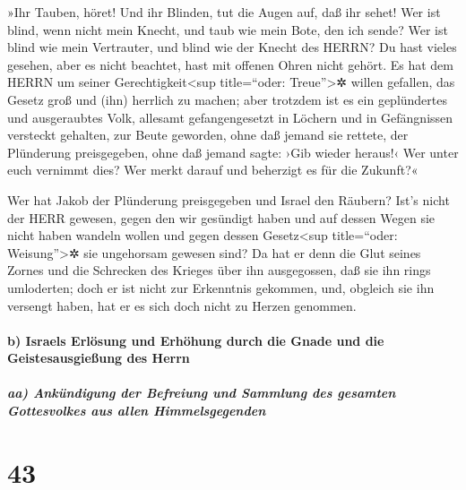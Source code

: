 »Ihr Tauben, höret! Und ihr Blinden, tut die Augen auf,
daß ihr sehet! Wer ist blind, wenn nicht mein Knecht, und
taub wie mein Bote, den ich sende? Wer ist blind wie mein Vertrauter,
und blind wie der Knecht des HERRN? Du hast vieles
gesehen, aber es nicht beachtet, hast mit offenen Ohren nicht gehört.
Es hat dem HERRN um seiner Gerechtigkeit\textless sup
title=``oder: Treue''\textgreater✲ willen gefallen, das Gesetz groß und
(ihn) herrlich zu machen; aber trotzdem ist es ein
geplündertes und ausgeraubtes Volk, allesamt gefangengesetzt in Löchern
und in Gefängnissen versteckt gehalten, zur Beute geworden, ohne daß
jemand sie rettete, der Plünderung preisgegeben, ohne daß jemand sagte:
›Gib wieder heraus!‹ Wer unter euch vernimmt dies? Wer
merkt darauf und beherzigt es für die Zukunft?«

Wer hat Jakob der Plünderung preisgegeben und Israel den
Räubern? Ist's nicht der HERR gewesen, gegen den wir gesündigt haben und
auf dessen Wegen sie nicht haben wandeln wollen und gegen dessen
Gesetz\textless sup title=``oder: Weisung''\textgreater✲ sie ungehorsam
gewesen sind? Da hat er denn die Glut seines Zornes und
die Schrecken des Krieges über ihn ausgegossen, daß sie ihn rings
umloderten; doch er ist nicht zur Erkenntnis gekommen, und, obgleich sie
ihn versengt haben, hat er es sich doch nicht zu Herzen genommen.

\hypertarget{b-israels-erluxf6sung-und-erhuxf6hung-durch-die-gnade-und-die-geistesausgieuxdfung-des-herrn}{%
\paragraph{b) Israels Erlösung und Erhöhung durch die Gnade und die
Geistesausgießung des
Herrn}\label{b-israels-erluxf6sung-und-erhuxf6hung-durch-die-gnade-und-die-geistesausgieuxdfung-des-herrn}}

\hypertarget{aa-ankuxfcndigung-der-befreiung-und-sammlung-des-gesamten-gottesvolkes-aus-allen-himmelsgegenden}{%
\subparagraph{aa) Ankündigung der Befreiung und Sammlung des gesamten
Gottesvolkes aus allen
Himmelsgegenden}\label{aa-ankuxfcndigung-der-befreiung-und-sammlung-des-gesamten-gottesvolkes-aus-allen-himmelsgegenden}}

\hypertarget{section-42}{%
\section{43}\label{section-42}}

